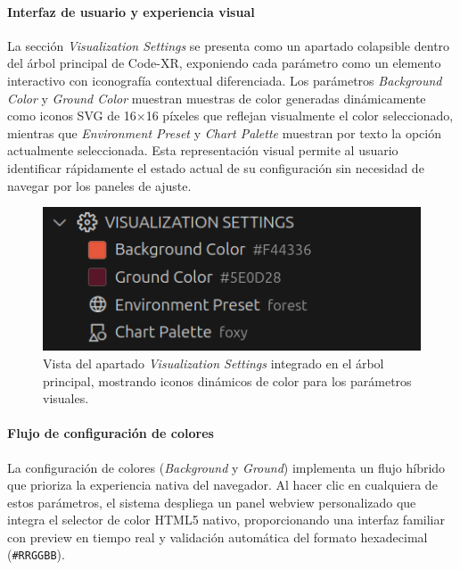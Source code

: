\documentclass[a4paper, 12pt]{book}
\begin{document}
\paragraph{Interfaz de usuario y experiencia visual}
La sección \emph{Visualization Settings} se presenta como un apartado colapsible dentro del árbol principal de Code-XR, exponiendo cada parámetro como un elemento interactivo con iconografía contextual diferenciada. Los parámetros \emph{Background Color} y \emph{Ground Color} muestran muestras de color generadas dinámicamente como iconos SVG de 16×16 píxeles que reflejan visualmente el color seleccionado, mientras que \emph{Environment Preset} y \emph{Chart Palette} muestran por texto la opción actualmente seleccionada. Esta representación visual permite al usuario identificar rápidamente el estado actual de su configuración sin necesidad de navegar por los paneles de ajuste.

\begin{figure}[H]
\centering
\includegraphics[width=0.60\linewidth]{img/ui-visualization-settings-tree.png}
\caption{Vista del apartado \emph{Visualization Settings} integrado en el árbol principal, mostrando iconos dinámicos de color para los parámetros visuales.}
\label{fig:ui-visualization-settings-tree}
\end{figure}

\paragraph{Flujo de configuración de colores}
La configuración de colores (\emph{Background} y \emph{Ground}) implementa un flujo híbrido que prioriza la experiencia nativa del navegador. Al hacer clic en cualquiera de estos parámetros, el sistema despliega un panel webview personalizado que integra el selector de color HTML5 nativo, proporcionando una interfaz familiar con preview en tiempo real y validación automática del formato hexadecimal (\texttt{\#RRGGBB}).
\end{document}
